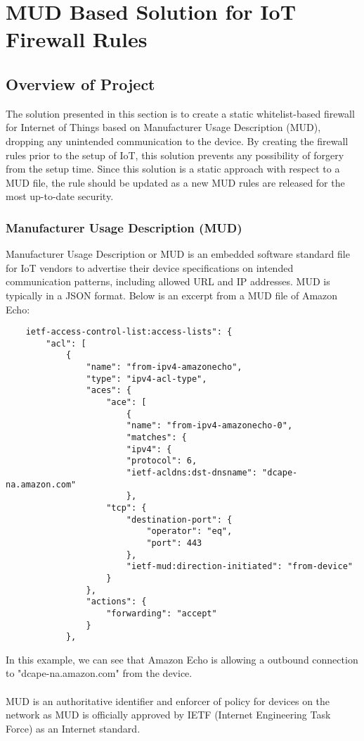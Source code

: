 \pagebreak
\section{MUD Based Solution for IoT Firewall Rules}
\subsection{Overview of Project}
The solution presented in this section is to create a static whitelist-based firewall for Internet of Things based on Manufacturer Usage Description (MUD), dropping any unintended communication to the device. By creating the firewall rules prior to the setup of IoT, this solution prevents any possibility of forgery from the setup time. Since this solution is a static approach with respect to a MUD file, the rule should be updated as a new MUD rules are released for the most up-to-date security. 

\subsubsection{Manufacturer Usage Description (MUD)}
Manufacturer Usage Description or MUD is an embedded software standard file for IoT vendors to advertise their device specifications on intended communication patterns, including allowed URL and IP addresses. MUD is typically in a JSON format. Below is an excerpt from a MUD file of Amazon Echo:
\begin{lstlisting}
    ietf-access-control-list:access-lists": {
        "acl": [
            {
                "name": "from-ipv4-amazonecho",
                "type": "ipv4-acl-type",
                "aces": {
                    "ace": [
                        {
                        "name": "from-ipv4-amazonecho-0",
                        "matches": {
                        "ipv4": {
                        "protocol": 6,
                        "ietf-acldns:dst-dnsname": "dcape-na.amazon.com"
                        },
                    "tcp": {
                        "destination-port": {
                            "operator": "eq",
                            "port": 443
                        },
                        "ietf-mud:direction-initiated": "from-device"
                    }
                },
                "actions": {
                    "forwarding": "accept"
                }
            },
\end{lstlisting}
In this example, we can see that Amazon Echo is allowing a outbound connection to "dcape-na.amazon.com" from the device. \\
\\
MUD is an authoritative identifier and enforcer of policy for devices on the network as MUD is officially approved by IETF (Internet Engineering Task Force) as an Internet standard. 

